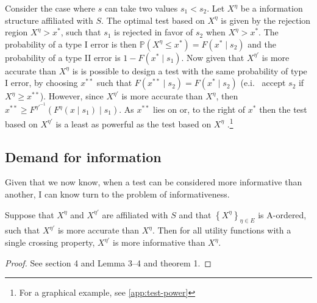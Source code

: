 \documentclass[10pt,a4paper]{article} 					%
\begin{document}
\begin{example}\label{ex:t-transformation-2}
Consider the case where $s$ can take two values $s_{1}<s_{2}$. Let $X^{\eta}$ be a information structure affiliated with $S$. The optimal test based on $X^{\eta}$ is given by the rejection region $X^{\eta}>x^{*}$, such that $s_{1}$ is rejected in favor of $s_{2}$ when $X^{\eta}>x^{*}$. The probability of a type I error is then $\mathbb{P}(X^{\eta}\le x^{*})=F(x^{*}\mid s_{2})$ and the probability of a type II error is $1-F(x^{*}\mid s_{1})$. Now given that $X^{\eta'}$ is more accurate than $X^{\eta}$ is is possible to design a test with the same probability of type I error, by choosing $x^{**}$ such that $F(x^{**}\mid s_{2})=F(x^{*}\mid s_{2})$ (e.i. \ accept $s_{2}$ if $X^{\eta}\ge x^{**}$). However, since $X^{\eta'}$ is more accurate than $X^{\eta}$, then $x^{**}\ge F^{\eta'^{-1}}(F^{\eta}(x\mid s_{1})\mid s_{1})$. As $x^{**}$ lies on or, to the right of $x^{*}$ then the test based on $X^{\eta'}$ is a least as powerful as the test based on $X^{\eta}$
\citep{Lehmann1988,Persico2000}.\footnote{For a graphical example, see \cref{app:test-power}}
\end{example}


\subsection{Demand for information}

Given that we now know, when a test can be considered more informative than another, I can know turn to the problem of informativeness.

\begin{thm}\label{thm:informative}
\parencite{Persico2000}
Suppose that $X^{\eta}$ and $X^{\eta'}$ are affiliated with $S$ and that $\left \{X^{\eta}\right \} _{\eta\in E}$ is A-ordered, such that $X^{\eta'}$ is more accurate than $X^{\eta}$. Then for all utility functions with a single crossing property, $X^{\eta'}$ is more informative than $X^{\eta}$.
\end{thm}

\begin{proof}
See \citet{Lehmann1988} section 4 and \citet{Karlin1956a} Lemma 3--4 and theorem 1.
\end{proof}
\end{document}
